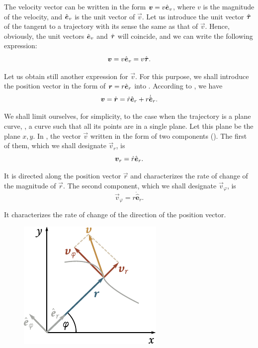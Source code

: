The velocity vector can be written in the form $\boldsymbol{v}=v\hat{\boldsymbol{e}}_{v}$, where $v$ is the magnitude of the velocity, and $\hat{\boldsymbol{e}}_{v}$ is the unit vector of $\vec{v}$. Let us introduce the unit vector $\hat{\boldsymbol{\tau}}$ of the tangent to a trajectory with its sense the same as that of $\vec{v}$. Hence, obviously, the unit vectors $\hat{\boldsymbol{e}}_{v}$ and $\hat{\boldsymbol{\tau}}$ will coincide, and we can write the following expression:
\vspace{-12pt}
\begin{equation}\label{eq:1_67}
\boldsymbol{v} = v\hat{\boldsymbol{e}}_{v} = v\hat{\boldsymbol{\tau}}.
\end{equation}

Let us obtain still another expression for $\vec{v}$. For this purpose, we shall introduce the position vector in the form of $\boldsymbol{r}=r\hat{\boldsymbol{e}}_{r}$ into . According to , we have
\begin{equation}\label{eq:1_68}
\boldsymbol{v} = \dot{\boldsymbol{r}} = \dot{r}\hat{\boldsymbol{e}}_{r} + r\dot{\hat{\boldsymbol{e}}}_r.
\end{equation}

\noindent
We shall limit ourselves, for simplicity, to the case when the trajectory is a plane curve, \ie, a curve such that all its points are in a single plane. Let this plane be the plane $x, y$. In , the vector $\vec{v}$ written in the form of two components (). The first of them, which we shall designate $\vec{v}_r$, is
\begin{equation}\label{eq:1_69}
\boldsymbol{v}_r = \dot{r}\hat{\boldsymbol{e}}_{r}.
\end{equation}

\noindent
It is directed along the position vector $\vec{r}$ and characterizes the rate of change of the magnitude of $\vec{r}$. The second component, which we shall designate $\vec{v}_{\varphi}$, is
\begin{equation}\label{eq:1_70}
\vec{v}_{\varphi} = r\dot{\hat{\boldsymbol{e}}}_r.
\end{equation}

\noindent
It characterizes the rate of change of the direction of the position vector.

\begin{figure}[t]
	\begin{center}
		\includegraphics[scale=1]{figures/ch_01/fig_1_25.pdf}
		\caption[]{}
		\label{fig:1_25}
	\end{center}
	\vspace{-0.7cm}
\end{figure}

